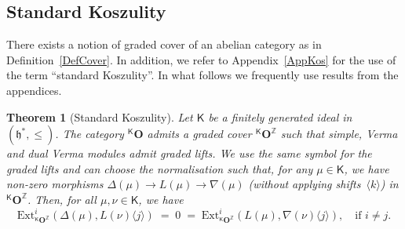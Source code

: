 \documentclass[11pt]{amsart}
\newcommand{\KKK}{\mathsf{K}}
\newcommand{\bO}{\mathbf{O}}
\newcommand{\Ext}{\mathrm{Ext}}
\newcommand{\fh}{\mathfrak{h}}
\newcommand{\mZ}{\mathbb{Z}}
\numberwithin{equation}{section}
\theoremstyle{plain}
\newtheorem{thm}[subsubsection]{Theorem}
\theoremstyle{remark}
\theoremstyle{remark}
\theoremstyle{construction}
\begin{document}
\subsection{Standard Koszulity}
{There exists a} notion of graded cover of an abelian category as in Definition~\ref{DefCover}{. In addition, we} refer to Appendix~\ref{AppKos} for  the use of the term ``standard Koszulity''. {In what follows we frequently use results from the appendices.}
\begin{thm}[Standard Koszulity]\label{ThmKosz}
Let $\KKK$ be a finitely generated ideal in $(\fh^\ast,\le)$. The category ${}^{\KKK}\bO$ admits a graded cover ${}^{\KKK}\bO^{\mZ}$ such that simple, Verma and dual Verma modules admit graded lifts. We use the same symbol for the graded lifts and can choose the normalisation such that, for any $\mu\in\KKK$,
we have non-zero morphisms $\Delta(\mu)\to L(\mu)\to\nabla(\mu)$ (without applying shifts~$\langle k\rangle$) in ${}^{\KKK}\bO^{\mZ}$.
Then, for all $\mu,\nu\in\KKK$, we have
$$\Ext^i_{{}^{\KKK}\bO^{\mZ}}(\Delta(\mu),L(\nu)\langle j\rangle)\;=\;0\;=\; \Ext^i_{{}^{\KKK}\bO^{\mZ}}(L(\mu),\nabla(\nu)\langle j\rangle),\quad\mbox{if $i\not=j$}.$$
\end{thm}
\end{document}
